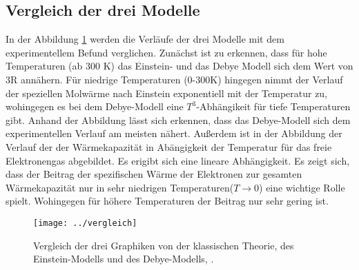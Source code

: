 \subsection{Vergleich der drei Modelle}
In der Abbildung \ref{fig:vergleich} werden die Verläufe der drei Modelle mit dem experimentellem Befund verglichen. Zunächst ist zu erkennen, dass für hohe Temperaturen (ab 300 K) das Einstein- und das Debye Modell sich dem Wert von 3R annähern. Für niedrige Temperaturen (0-300K) hingegen nimmt der Verlauf der speziellen Molwärme nach Einstein exponentiell mit der Temperatur zu, wohingegen es bei dem Debye-Modell eine $T^3$-Abhängikeit für tiefe Temperaturen gibt. Anhand der Abbildung lässt sich erkennen, dass das Debye-Modell sich dem experimentellen Verlauf am meisten nähert. Außerdem ist in der Abbildung der Verlauf der der Wärmekapazität in Abängigkeit der Temperatur für das freie Elektronengas abgebildet. Es erigibt sich eine lineare Abhängigkeit. Es zeigt sich, dass der Beitrag der spezifischen Wärme der Elektronen zur gesamten Wärmekapazität nur in sehr niedrigen Temperaturen($T\rightarrow 0$) eine wichtige Rolle spielt. Wohingegen für höhere Temperaturen der Beitrag nur sehr gering ist. 

\begin{figure}[h!]
	\centering
	\texttt{[image: ../vergleich]}
	\caption{Vergleich der drei Graphiken von der klassischen Theorie, des Einstein-Modells und des Debye-Modells, \cite{Vergleichder3Modelle}.}
	\label{fig:vergleich}
\end{figure}


